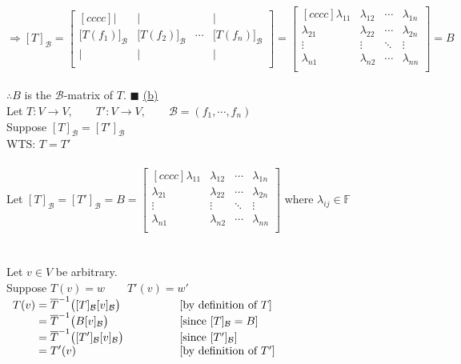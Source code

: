 \documentclass[12pt]{article}
\renewcommand{\qed}{\hfill$\blacksquare$}
\begin{document}
$\Longrightarrow [T]_\mathcal{B} =\begin{bmatrix}[cccc]
		|                            & |                            &        & |                            \\
		\big[T(f_1)\big]_\mathcal{B} & \big[T(f_2)\big]_\mathcal{B} & \cdots & \big[T(f_n)\big]_\mathcal{B} \\
		|                            & |                            &        & |                            \\
	\end{bmatrix} = \begin{bmatrix}[cccc]
		\lambda_{11} & \lambda_{12} & \cdots & \lambda_{1n} \\
		\lambda_{21} & \lambda_{22} & \cdots & \lambda_{2n} \\
		\vdots       & \vdots       & \ddots & \vdots       \\
		\lambda_{n1} & \lambda_{n2} & \cdots & \lambda_{nn} \\
	\end{bmatrix}
	=B$
\\\\$\therefore B$ is the $\mathcal{B}$-matrix of $T$. \qed \newpage
	\hyperlink{toc}{\hypertarget{4.2}{(b)}}\\
	Let $T: V \longrightarrow V, \qquad T': V \longrightarrow V, \qquad \mathcal{B} = (f_1, \cdots, f_n)$\\
	Suppose $[T]_\mathcal{B} = [T']_\mathcal{B}$\\
	WTS: $T = T'$
	\\\\
	Let $[T]_\mathcal{B} = [T']_\mathcal{B} = B = \begin{bmatrix}[cccc]
	\lambda_{11} & \lambda_{12} & \cdots & \lambda_{1n} \\
	\lambda_{21} & \lambda_{22} & \cdots & \lambda_{2n} \\
	\vdots       & \vdots       & \ddots & \vdots       \\
	\lambda_{n1} & \lambda_{n2} & \cdots & \lambda_{nn} \\
\end{bmatrix}$ \qquad where $\lambda_{ij} \in \mathbb{F}$
	\\\\\\
	Let $v \in V$ be arbitrary. \\
	Suppose $T(v) = w \qquad T'(v) = w'$\\
$\begin{array}{r@{}>{\displaystyle}ll}
	T(v) & {}= \overline{T}^{-1}\big( [T]_\mathcal{B} [v]_\mathcal{B} \big)                & [\text{by definition of }T]         \\
	     & {}= \overline{T}^{-1}\big( B [v]_\mathcal{B} \big)                              & [\text{since } [T]_\mathcal{B} = B] \\
	     & {}= \overline{T}^{-1}\big( [T']_\mathcal{B} [v]_\mathcal{B} \big) \qquad \qquad & [\text{since } [T']_\mathcal{B}]    \\
	     & {}= T'(v)                                                                       & [\text{by definition of }T']        \\
\end{array}$\\
\end{document}
